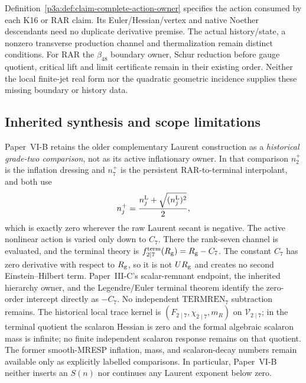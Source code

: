 \documentclass[12pt,a4paper]{article}
\begin{document}
\begin{remark}
\label{p9:rem:m8-batch-readout-inputs}
Definition~\ref{p3a:def:claim-complete-action-owner}
specifies the action consumed by each K16 or RAR claim.
Its Euler/Hessian/vertex and native Noether descendants
need no duplicate derivative premise.  The actual
history/state, a nonzero transverse production channel
and thermalization remain distinct conditions.
For RAR the \(\beta_{48}\) boundary owner, Schur reduction
before gauge quotient, critical lift and limit certificate
remain in their existing order.  Neither the local
finite-jet real form nor the quadratic geometric incidence
supplies these missing boundary or history data.
\end{remark}

\subsection{Inherited synthesis and scope limitations}
Paper~VI-B retains the older complementary Laurent construction as a
\emph{historical grade-two comparison}, not as its active inflationary
owner. In that comparison \(n_2^+\) is the inflation dressing and \(n_7^+\)
is the persistent RAR-to-terminal interpolant, and both use
\[
n_j^+=\frac{n_j^{\rm L}+\sqrt{(n_j^{\rm L})^2}}2,
\]
which is exactly zero wherever the raw Laurent secant is negative.  The active
nonlinear action is varied only down to \(C_7\).  There the rank-seven channel
is evaluated, and the terminal theory is
\(f_{2\mid7}^{\rm term}(R_{\rm g})=R_{\rm g}-C_7\).  The constant
\(C_7\) has zero derivative with respect to \(R_{\rm g}\), so it is not
\(U R_{\rm g}\) and creates no second Einstein--Hilbert term.
Paper~III-C's scalar-remnant endpoint, the inherited hierarchy owner, and
the Legendre/Euler terminal theorem identify the zero-order intercept directly
as \(-C_7\).  No independent \(\mathrm{TERMREN}_7\) subtraction remains.
The historical local trace kernel is
\((F_{2\mid7},\chi_{2\mid7},m_R)\) on \(\mathscr V_{2\mid7}\); in the terminal quotient
the scalaron Hessian is zero and the formal algebraic scalaron mass is
infinite; no finite independent scalaron response remains on that quotient.  The former smooth-MRESP inflation, mass, and
scalaron-decay numbers remain available only as explicitly labelled
comparisons.  In particular, Paper~VI-B neither inserts an \(S(n)\) nor
continues any Laurent exponent below zero.
\end{document}
